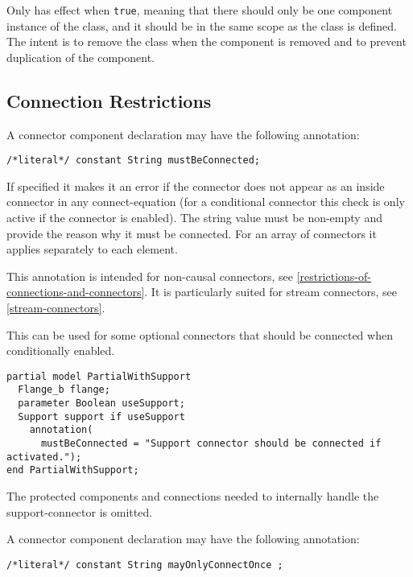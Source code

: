 Only has effect when \lstinline!true!, meaning that there should only be one component instance of the class, and it should be in the same scope as the class is defined.
The intent is to remove the class when the component is removed and to prevent duplication of the component.

\subsection{Connection Restrictions}\label{connection-restrictions}

A connector component declaration may have the following annotation:
\begin{lstlisting}[language=modelica]
/*literal*/ constant String mustBeConnected;
\end{lstlisting}%

If specified it makes it an error if the connector does not appear as an inside connector in any connect-equation (for a conditional connector this check is only active if the connector is enabled).
The string value must be non-empty and provide the reason why it must be connected.
For an array of connectors it applies separately to each element.

\begin{nonnormative}
This annotation is intended for non-causal connectors, see \cref{restrictions-of-connections-and-connectors}.
It is particularly suited for stream connectors, see \cref{stream-connectors}.
\end{nonnormative}

\begin{example}
This can be used for some optional connectors that should be connected when conditionally enabled.
\begin{lstlisting}[language=modelica]
partial model PartialWithSupport
  Flange_b flange;
  parameter Boolean useSupport;
  Support support if useSupport
    annotation(
      mustBeConnected = "Support connector should be connected if activated.");
end PartialWithSupport;
\end{lstlisting}
The protected components and connections needed to internally handle the support-connector is omitted.
\end{example}

A connector component declaration may have the following annotation:
\begin{lstlisting}[language=modelica]
/*literal*/ constant String mayOnlyConnectOnce ;
\end{lstlisting}%

